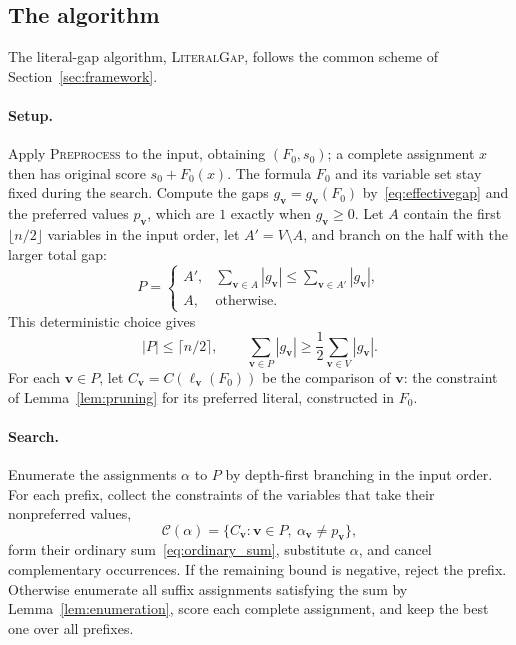\documentclass[11pt,a4paper]{article}
\theoremstyle{definition}
\theoremstyle{remark}
\begin{document}
\subsection{The algorithm}\label{sec:bias_algorithm}

The literal-gap algorithm, \textnormal{\textsc{LiteralGap}}, follows the
common scheme of Section~\ref{sec:framework}.

\paragraph{Setup.}
Apply \textnormal{\textsc{Preprocess}} to the input, obtaining $(F_0,s_0)$; a
complete assignment $x$ then has original score $s_0+F_0(x)$. The formula
$F_0$ and its variable set stay fixed during the search. Compute the gaps
$g_{\mathbf v}=g_{\mathbf v}(F_0)$ by~\eqref{eq:effectivegap} and the
preferred values $p_{\mathbf v}$, which are $1$ exactly when
$g_{\mathbf v}\ge0$. Let $A$ contain the first
$\lfloor n/2\rfloor$ variables in the input order, let $A'=V\setminus A$, and
branch on the half with the larger total gap:
\begin{equation}
 P=\begin{cases}
 A',&\displaystyle\sum_{\mathbf v\in A}|g_{\mathbf v}|
          \le\sum_{\mathbf v\in A'}|g_{\mathbf v}|,\\
 A,&\text{otherwise}.
 \end{cases}
 \label{eq:bias_prefix}
\end{equation}
This deterministic choice gives
\begin{equation}
 |P|\le\lceil n/2\rceil,\qquad
 \sum_{\mathbf v\in P}|g_{\mathbf v}|
       \ge\frac12\sum_{\mathbf v\in V}|g_{\mathbf v}|.
 \label{eq:bias_half}
\end{equation}
For each $\mathbf v\in P$, let $C_{\mathbf v}=C(\ell_{\mathbf v}(F_0))$ be the
comparison of $\mathbf v$: the constraint of Lemma~\ref{lem:pruning} for
its preferred literal, constructed in $F_0$.

\paragraph{Search.}
Enumerate the assignments $\alpha$ to $P$ by depth-first branching in the
input order. For each prefix, collect the constraints of the variables that
take their nonpreferred values,
\[
 \mathcal C(\alpha)=
 \{C_{\mathbf v}:\mathbf v\in P,\ \alpha_{\mathbf v}\ne p_{\mathbf v}\},
\]
form their ordinary sum~\eqref{eq:ordinary_sum}, substitute $\alpha$, and
cancel complementary occurrences. If the remaining bound is negative, reject
the prefix. Otherwise enumerate all suffix assignments satisfying the sum by
Lemma~\ref{lem:enumeration}, score each complete assignment, and keep the
best one over all prefixes.
\end{document}

